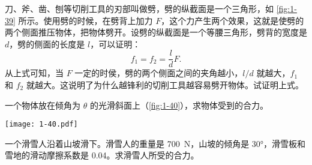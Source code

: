 \begin{Exercise}
\begin{question}
\item  刀、斧、凿、刨等切削工具的刃部叫做劈，劈的纵截面是一个三角形，如 \cref{fig:1-39} 所示。使用劈的时候，在劈背上加力 $F$，这个力产生两个效果，这就是使劈的两个侧面推压物体，把物体劈开。设劈的纵截面是一个等腰三角形，劈背的宽度是  $d$，劈的侧面的长度是 $l$，可以证明：
\[f_1=f_2=\frac{l}{d}F. \]
从上式可知，当 $F$ 一定的时侯，劈的两个侧面之间的夹角越小，$l/d$ 就越大，$f_1$ 和 $f_2$ 就越大。这说明了为什么越锋利的切削工具越容易劈开物体。试证明上式。
\item 一个物体放在倾角为 $\theta$ 的光滑斜面上（\cref{fig:1-40}），求物体受到的合力。
\begin{figurehere}
  \begin{minipage}{\linewidth}\centering
    \texttt{[image: 1-40.pdf]}
    \caption{}\label{fig:1-40}
  \end{minipage}
\end{figurehere}
\item 一个滑雪人沿着山坡滑下。滑雪人的重量是 \qty{700}{N}，山坡的倾角是 \ang{30}，滑雪板和雪地的滑动摩擦系数是 0.04。求滑雪人所受的合力。
\end{question}
\end{Exercise}